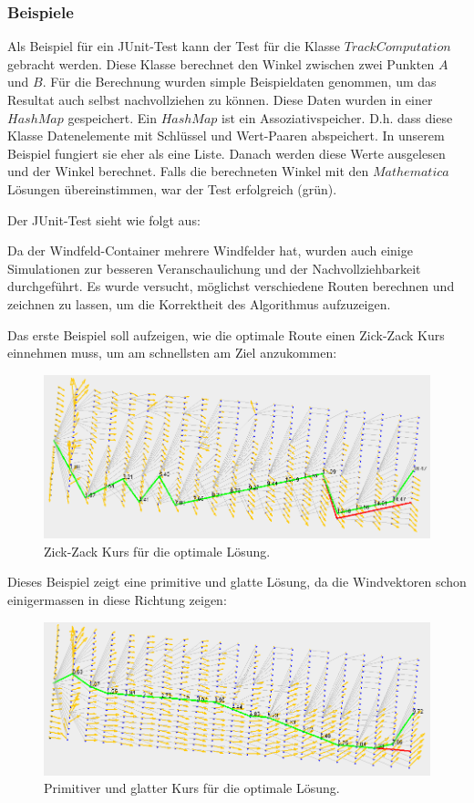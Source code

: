 \subsubsection{Beispiele}
Als Beispiel für ein JUnit-Test kann der Test für die Klasse $TrackComputation$ gebracht werden. 
Diese Klasse berechnet den Winkel zwischen zwei Punkten $A$ und $B$. Für die Berechnung
wurden simple Beispieldaten genommen, um das Resultat auch selbst nachvollziehen zu können.
Diese Daten wurden in einer $HashMap$ gespeichert. Ein $HashMap$ ist ein Assoziativspeicher. 
D.h. dass diese Klasse Datenelemente mit Schlüssel und Wert-Paaren abspeichert. In unserem
Beispiel fungiert sie eher als eine Liste. Danach werden diese Werte ausgelesen und der 
Winkel berechnet. Falls die berechneten Winkel mit den $Mathematica$ Lösungen übereinstimmen,
war der Test erfolgreich (grün).

Der JUnit-Test sieht wie folgt aus:



Da der Windfeld-Container mehrere Windfelder hat, wurden auch einige Simulationen 
zur besseren Veranschaulichung und der Nachvollziehbarkeit durchgeführt. Es wurde versucht,
möglichst verschiedene Routen berechnen und zeichnen zu lassen, um die Korrektheit des
Algorithmus aufzuzeigen. 

Das erste Beispiel soll aufzeigen, wie die optimale Route einen Zick-Zack Kurs einnehmen muss,
um am schnellsten am Ziel anzukommen:

\begin{figure}[h!]
\centering
\includegraphics[width=0.8\linewidth]{img/gridNet_1}
\caption{Zick-Zack Kurs für die optimale Lösung.}
\label{gridnet1}
\end{figure}

Dieses Beispiel zeigt eine primitive und glatte Lösung, da die Windvektoren
schon einigermassen in diese Richtung zeigen:

\begin{figure}[h!]
\centering
\includegraphics[width=0.8\linewidth]{img/gridNet_2}
\caption{Primitiver und glatter Kurs für die optimale Lösung.}
\label{gridnet2}
\end{figure}

